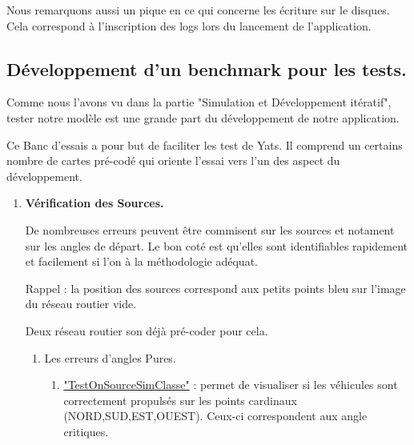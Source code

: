 \documentclass[a4paper,11pt]{article}
\begin{document}
Nous remarquons aussi un pique en ce qui concerne les écriture sur le disques. Cela correspond à l'inscription des logs lors du lancement de l'application.

\subsection{Développement d'un benchmark pour les tests.}

Comme nous l'avons vu dans la partie "Simulation et Développement itératif", tester notre modèle est une grande part du développement de notre application.

Ce Banc d'essais a pour but de faciliter les test de Yats. Il comprend un certains nombre de cartes pré-codé qui oriente l'essai vers l'un des aspect du développement.

\begin{enumerate}[label=-]


\item \textbf{Vérification des Sources.}

De nombreuses erreurs peuvent être commisent sur les sources et notament sur les angles de départ. Le bon coté est qu'elles sont identifiables rapidement et facilement si l'on à la méthodologie adéquat. 

Rappel : la position des sources correspond aux petits points bleu sur l'image du réseau routier vide.

Deux réseau routier son déjà pré-coder pour cela. 



\begin{enumerate}[label=\Alph*)]
\item Les erreurs d'angles Pures.
\begin{enumerate}[label=$\square$]
\item \underline{"TestOnSourceSimClasse"} : permet de visualiser si les véhicules sont correctement propulsés sur les points cardinaux (NORD,SUD,EST,OUEST). Ceux-ci correspondent aux angle critiques.


\end{enumerate}
\end{enumerate}
\end{enumerate}
\end{document}
